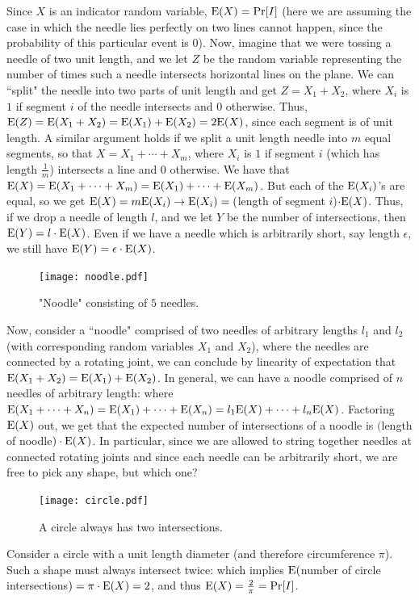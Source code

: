 \documentclass[11pt]{article}
\def\Ex#1{{\rm E}(#1)}
\begin{document}
Since $X$ is an indicator random variable,  $\Ex{X} = \Pr[I] $
(here we are assuming the case in which the needle lies perfectly on two lines cannot happen, since
the probability of this particular event is $0$).
Now, imagine that we were tossing a needle of two unit length, and we let $Z$ be the random
variable representing the number of times such a needle intersects horizontal lines on the plane.
We can ``split" the needle into two parts of unit length and get $Z = X_1 + X_2$, where $X_i$
is $1$ if segment $i$ of the needle intersects and $0$ otherwise.  Thus, $\Ex{Z} = \Ex{X_1 + X_2}
= \Ex{X_1} + \Ex{X_2} = 2\Ex{X}$, since each segment is of unit length.  A similar argument holds
if we split a unit length needle into $m$ equal segments, so that $X = X_1 + \cdots + X_m$, where $X_i$
is $1$ if segment $i$ (which has length $\frac{1}{m}$) intersects a line and $0$ otherwise.  We have
that $\Ex{X} = \Ex{X_1 + \cdots + X_m} = \Ex{X_1} + \cdots + \Ex{X_m}$.  But each of the $\Ex{X_i}$'s are
equal, so we get $\Ex{X} = m\Ex{X_i} \rightarrow \Ex{X_i} = ($length of segment $i$)$\cdot \Ex{X}$.
Thus, if we drop a needle of length $l$, and we let $Y$ be the number of intersections, then
$\Ex{Y} = l \cdot \Ex{X}$.  Even if we have a needle which is arbitrarily short, say length $\epsilon$, we
still have $\Ex{Y} = \epsilon \cdot \Ex{X}$.  

\begin{figure}[h]
\begin{center}
\texttt{[image: noodle.pdf]}
\end{center}
\caption{"Noodle" consisting of $5$ needles.}
\label{fig:noodle}
\end{figure}


Now, consider a ``noodle" comprised of
two needles of arbitrary lengths $l_1$ and $l_2$ (with corresponding random variables $X_1$ and $X_2$),
where the needles are connected by a rotating joint, we can conclude by linearity of expectation that
$\Ex{X_1 + X_2} = \Ex{X_1} + \Ex{X_2}$.  In general, we can have a noodle comprised of $n$ needles
of arbitrary length:
where $\Ex{X_1 + \cdots + X_n} = \Ex{X_1} + \cdots + \Ex{X_n} = l_1\Ex{X} + \cdots + l_n\Ex{X}$.  Factoring
$\Ex{X}$ out, we get that the expected number of intersections of a noodle is $($length of noodle$) \cdot \Ex{X}$.
In particular, since we are allowed to string together needles at connected rotating joints and since each needle
can be arbitrarily short, we are free to pick any shape, but which one?  

\begin{figure}[h]
\begin{center}
\texttt{[image: circle.pdf]}
\end{center}
\caption{A circle always has two intersections.}
\label{fig:circle}
\end{figure}

Consider a circle with a unit
length diameter (and therefore circumference $\pi$).  Such a shape must always intersect twice:
which implies $\Ex{$number of circle intersections$} = \pi \cdot \Ex{X} = 2$, and
thus $\Ex{X} = \frac{2}{\pi} = \Pr[I]$.
\end{document}
